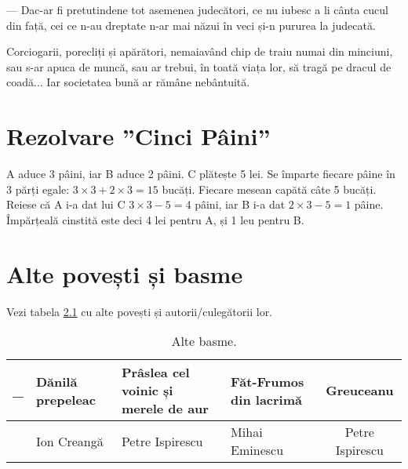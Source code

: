 \documentclass[12pt, a4paper, oneside, romanian]{teza-upb}
\begin{document}
— Dac-ar fi pretutindene tot asemenea judecători, ce nu iubesc a li cânta cucul din față, cei ce n-au dreptate n-ar mai năzui în veci și-n pururea la judecată.

Corciogarii, porecliți și apărători, nemaiavând chip de traiu numai din minciuni, sau s-ar apuca de muncă, sau ar trebui, în toată viața lor, să tragă pe dracul de coadă... Iar societatea bună ar rămâne nebântuită.







\appendix
\chapter {Rezolvare ''Cinci Pâini''}
A aduce 3 pâini, iar B aduce 2 pâini. C plătește 5 lei.  Se împarte
fiecare pâine în 3 părți egale: $3 \times 3 + 2 \times 3 = 15$
bucăți. Fiecare mesean capătă câte 5 bucăți. Reiese că A i-a dat lui C
$3 \times 3 - 5 = 4$ pâini, iar B i-a dat $2 \times 3 - 5 = 1$
pâine. Împărțeală cinstită este deci 4 lei pentru A, și 1 leu pentru B.

\chapter{Alte povești și basme}

 Vezi tabela \ref{altebasme} cu alte povești și autorii/culegătorii lor.



\begin{table}
\begin{tabular}[t]{c|p{3cm}|p{3cm}|p{3cm}|c}
\_ & Dănilă prepeleac & Prâslea cel voinic și merele de aur & Făt-Frumos din lacrimă & Greuceanu \\
\hline
 & Ion Creangă & Petre Ispirescu & Mihai Eminescu & Petre Ispirescu \\
\end{tabular}
\label{altebasme}
\caption{Alte basme.}
\end{table}
\end{document}

